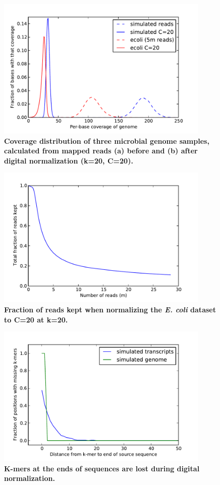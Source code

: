 \begin{figure}[!ht]
\centerline{\includegraphics[width=4in]{diginorm-coverage.pdf}}


\caption{
{\bf Coverage distribution of three microbial genome samples, calculated
from mapped reads (a) before and (b) after digital normalization (k=20, C=20).}}
\label{fig:coverage}
\end{figure}

\begin{figure}[!ht]
\centerline{\includegraphics[width=4in]{diginorm-accumulation.pdf}}
\caption{
{\bf Fraction of reads kept when normalizing the {\em E. coli} dataset to C=20 at k=20.}}
\label{fig:accumulate}
\end{figure}

\begin{figure}[!ht]
\centerline{\includegraphics[width=4in]{diginorm-endbias.pdf}}
\caption{
{\bf K-mers at the ends of sequences are lost during digital normalization.}}
\label{fig:endloss}
\end{figure}

